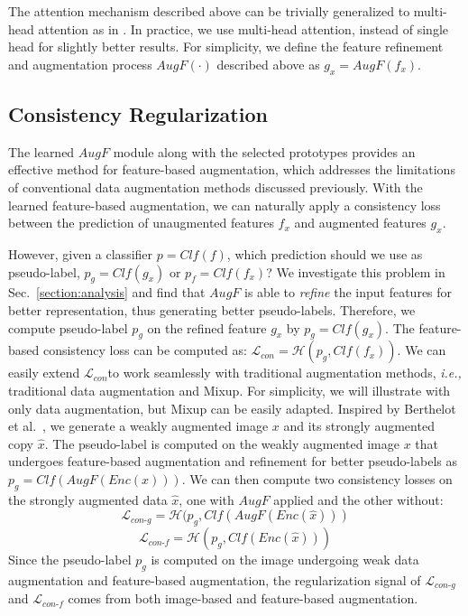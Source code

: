 \documentclass[runningheads]{llncs}
\begin{document}
The attention mechanism described above can be trivially generalized to multi-head attention as in \cite{vaswani2017attention}.
In practice, we use multi-head attention, instead of single head for slightly better results.
For simplicity, we define the feature refinement and augmentation process $AugF(\cdot)$ described above as $g_x = AugF(f_x)$.



\subsection{Consistency Regularization}\label{sec:consistency-regularization}
The learned $AugF$ module along with the selected prototypes provides an effective method for feature-based augmentation, which addresses the limitations of conventional data augmentation methods discussed previously.
With the learned feature-based augmentation, we can naturally apply a consistency loss between the prediction of unaugmented features $f_x$ and augmented features $g_x$.

However, given a classifier $p = Clf(f)$, which prediction should we use as pseudo-label, $p_g = Clf(g_x)$ or $p_f = Clf(f_x)$?
We investigate this problem in Sec.~\ref{section:analysis} and find that $AugF$ is able to \emph{refine} the input features for better representation, thus generating better pseudo-labels.
Therefore, we compute pseudo-label $p_g$ on the refined feature $g_x$ by $p_g = Clf(g_x)$.
The feature-based consistency loss can be computed as: $\mathcal{L}_{con} = \mathcal{H}(p_g, Clf(f_x))$.
We can easily extend $\mathcal{L}_{con}$to work seamlessly with traditional augmentation methods, \textit{i.e.,} traditional data augmentation and Mixup.
For simplicity, we will illustrate with only data augmentation, but Mixup can be easily adapted.
Inspired by Berthelot et al.~\cite{berthelot2019remixmatch}, we generate a weakly augmented image $x$ and its strongly augmented copy $\hat{x}$.
The pseudo-label is computed on the weakly augmented image $x$ that undergoes feature-based augmentation and refinement for better pseudo-labels as $p_g = Clf(AugF(Enc(x)))$.
We can then compute two consistency losses on the strongly augmented data $\hat{x}$, one with $AugF$ applied and the other without:
\begin{equation}\label{eq:con-g}
    \mathcal{L}_{con\text{-}g} = \mathcal{H}(p_g, Clf(AugF(Enc(\hat{x})))
\end{equation}
\begin{equation}\label{eq:con-f}
    \mathcal{L}_{con\text{-}f} = \mathcal{H}(p_g, Clf(Enc(\hat{x})))
\end{equation}
Since the pseudo-label $p_g$ is computed on the image undergoing weak data augmentation and feature-based augmentation, the regularization signal of $\mathcal{L}_{con\text{-}g}$ and $\mathcal{L}_{con\text{-}f}$ comes from both image-based and feature-based augmentation.
\end{document}
